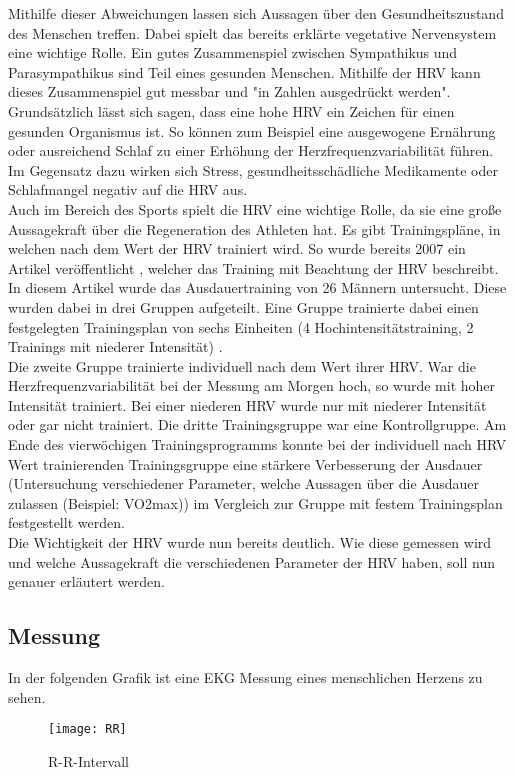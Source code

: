 Mithilfe dieser Abweichungen lassen sich Aussagen über den Gesundheitszustand des Menschen treffen. Dabei spielt das bereits erklärte vegetative Nervensystem eine wichtige Rolle. Ein gutes Zusammenspiel zwischen Sympathikus und Parasympathikus sind Teil eines gesunden Menschen. Mithilfe der HRV kann dieses Zusammenspiel gut messbar und "in Zahlen ausgedrückt werden". 
Grundsätzlich lässt sich sagen, dass eine hohe HRV ein Zeichen für einen gesunden Organismus ist. So können zum Beispiel eine ausgewogene Ernährung oder ausreichend Schlaf zu einer Erhöhung der Herzfrequenzvariabilität führen. Im Gegensatz dazu wirken sich Stress, gesundheitsschädliche Medikamente oder Schlafmangel negativ auf die HRV aus.\cite{hrv} \\
Auch im Bereich des Sports spielt die HRV eine wichtige Rolle, da sie eine große Aussagekraft über die Regeneration des Athleten hat. Es gibt Trainingspläne, in welchen nach dem Wert der HRV trainiert wird. So wurde bereits 2007 ein Artikel veröffentlicht \cite{sport}, welcher das Training mit Beachtung der HRV beschreibt. In diesem Artikel wurde das Ausdauertraining von 26 Männern untersucht. Diese wurden dabei in drei Gruppen aufgeteilt. Eine Gruppe trainierte dabei einen festgelegten Trainingsplan von sechs Einheiten (4 Hochintensitätstraining, 2 Trainings mit niederer Intensität) .\\
Die zweite Gruppe trainierte individuell nach dem Wert ihrer HRV. War die Herzfrequenzvariabilität bei der Messung am Morgen hoch, so wurde mit hoher Intensität trainiert. Bei einer niederen HRV wurde nur mit niederer Intensität oder gar nicht trainiert. Die dritte Trainingsgruppe war eine Kontrollgruppe. 
Am Ende des vierwöchigen Trainingsprogramms konnte bei der individuell nach HRV Wert trainierenden Trainingsgruppe eine stärkere Verbesserung der Ausdauer (Untersuchung verschiedener Parameter, welche Aussagen über die Ausdauer zulassen (Beispiel: VO2max)) im Vergleich zur Gruppe mit festem Trainingsplan festgestellt werden.\cite{sport}\\

Die Wichtigkeit der HRV wurde nun bereits deutlich. Wie diese gemessen wird und welche Aussagekraft die verschiedenen Parameter der HRV haben, soll nun genauer erläutert werden.

\subsection{Messung}
In der folgenden Grafik ist eine EKG Messung eines menschlichen Herzens zu sehen.
\begin{figure}[H]
    \centering
    \texttt{[image: RR]}
    \caption{R-R-Intervall}
    \label{fig:R-R-Intervall}
    \cite{rrbild}
\end{figure}

